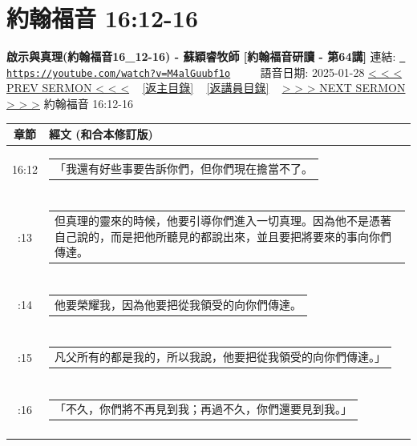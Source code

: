 \documentclass{book}
\begin{document}
\section{約翰福音 16:12-16}
\label{sec:M4alGuubf1o}
\textbf{啟示與真理(約翰福音16\_12-16) - 蘇穎睿牧師 [約翰福音研讀 - 第64講]}
\newline
\newline
連結: \href{https://youtube.com/watch?v=M4alGuubf1o}{\texttt{ https://youtube.com/watch?v=M4alGuubf1o}} ~~~~ 語音日期: 2025-01-28 
\newline
\newline
\hyperref[sec:pF1FrHKEPww]{< < < PREV SERMON < < <}
~
\hyperlink{toc}{[返主目錄]}
~
\hyperref[ch:preacher9]{[返講員目錄]}
~
\hyperref[sec:HaGDtN4u47U]{> > > NEXT SERMON > > >}
\newline
\newline
約翰福音 16:12-16
\newline
\begin{longtable}{cl}
\hline
\hline
章節 & 經文 (和合本修訂版)\\
\hline
16:12 & \begin{tabularx}{0.7\textwidth}{X} 「我還有好些事要告訴你們，但你們現在擔當不了。 \end{tabularx} \\ \\ \relax
16:13 & \begin{tabularx}{0.7\textwidth}{X} 但真理的靈來的時候，他要引導你們進入一切真理。因為他不是憑著自己說的，而是把他所聽見的都說出來，並且要把將要來的事向你們傳達。 \end{tabularx} \\ \\ \relax
16:14 & \begin{tabularx}{0.7\textwidth}{X} 他要榮耀我，因為他要把從我領受的向你們傳達。 \end{tabularx} \\ \\ \relax
16:15 & \begin{tabularx}{0.7\textwidth}{X} 凡父所有的都是我的，所以我說，他要把從我領受的向你們傳達。」 \end{tabularx} \\ \\ \relax
16:16 & \begin{tabularx}{0.7\textwidth}{X} 「不久，你們將不再見到我；再過不久，你們還要見到我。」 \end{tabularx} \\ \\
[1ex]
\hline
\hline
\end{longtable}
\end{document}
